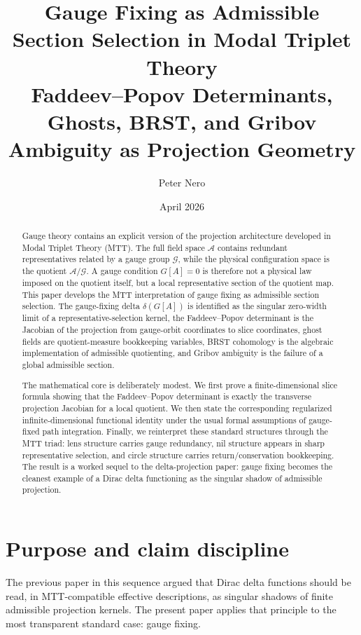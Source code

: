 \documentclass[11pt]{article}
\title{\textbf{Gauge Fixing as Admissible Section Selection in Modal Triplet Theory}\\
\large Faddeev--Popov Determinants, Ghosts, BRST, and Gribov Ambiguity as Projection Geometry}
\author{Peter Nero}
\date{April 2026}
\newcommand{\A}{\mathcal A}
\newcommand{\G}{\mathcal G}
\begin{document}
\maketitle

\begin{abstract}
Gauge theory contains an explicit version of the projection architecture developed in Modal Triplet Theory (MTT). The full field space \(\A\) contains redundant representatives related by a gauge group \(\G\), while the physical configuration space is the quotient \(\A/\G\). A gauge condition \(G[A]=0\) is therefore not a physical law imposed on the quotient itself, but a local representative section of the quotient map. This paper develops the MTT interpretation of gauge fixing as admissible section selection. The gauge-fixing delta \(\delta(G[A])\) is identified as the singular zero-width limit of a representative-selection kernel, the Faddeev--Popov determinant is the Jacobian of the projection from gauge-orbit coordinates to slice coordinates, ghost fields are quotient-measure bookkeeping variables, BRST cohomology is the algebraic implementation of admissible quotienting, and Gribov ambiguity is the failure of a global admissible section.

The mathematical core is deliberately modest. We first prove a finite-dimensional slice formula showing that the Faddeev--Popov determinant is exactly the transverse projection Jacobian for a local quotient. We then state the corresponding regularized infinite-dimensional functional identity under the usual formal assumptions of gauge-fixed path integration. Finally, we reinterpret these standard structures through the MTT triad: lens structure carries gauge redundancy, nil structure appears in sharp representative selection, and circle structure carries return/conservation bookkeeping. The result is a worked sequel to the delta-projection paper: gauge fixing becomes the cleanest example of a Dirac delta functioning as the singular shadow of admissible projection.
\end{abstract}

\seriestagline

\tableofcontents

\section{Purpose and claim discipline}

The previous paper in this sequence argued that Dirac delta functions should be read, in MTT-compatible effective descriptions, as singular shadows of finite admissible projection kernels. The present paper applies that principle to the most transparent standard case: gauge fixing.
\end{document}
